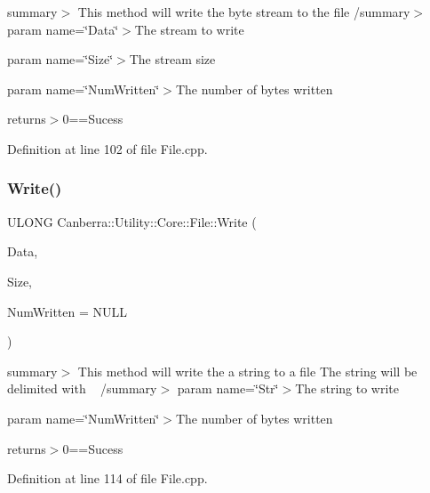 summary$>$ This method will write the byte stream to the file /summary$>$ param name=\char`\"{}\+Data\char`\"{}$>$The stream to write

param name=\char`\"{}\+Size\char`\"{}$>$The stream size

param name=\char`\"{}\+Num\+Written\char`\"{}$>$The number of bytes written

returns$>$0==Sucess

Definition at line 102 of file File.\+cpp.

\mbox{\label{class_canberra_1_1_utility_1_1_core_1_1_file_a2ff9ae175a2a9d7129ed75828a5ce805_a2ff9ae175a2a9d7129ed75828a5ce805}} 
\subsubsection{\texorpdfstring{Write()}{Write()}\hspace{0.1cm}{\footnotesize\ttfamily [2/2]}}
{\footnotesize\ttfamily U\+L\+O\+NG Canberra\+::\+Utility\+::\+Core\+::\+File\+::\+Write (\begin{DoxyParamCaption}\item[{const void $\ast$const}]{Data,  }\item[{U\+L\+O\+NG}]{Size,  }\item[{U\+L\+O\+NG $\ast$}]{Num\+Written = {\ttfamily NULL} }\end{DoxyParamCaption})}

summary$>$ This method will write the a string to a file The string will be delimited with ~\newline
 /summary$>$ param name=\char`\"{}\+Str\char`\"{}$>$The string to write

param name=\char`\"{}\+Num\+Written\char`\"{}$>$The number of bytes written

returns$>$0==Sucess

Definition at line 114 of file File.\+cpp.

\mbox{\label{class_canberra_1_1_utility_1_1_core_1_1_file_af4fdd54b2bd049c5a00d0831a66e0c77_af4fdd54b2bd049c5a00d0831a66e0c77}} 
